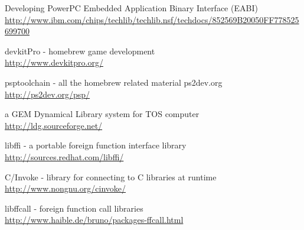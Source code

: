 \begin{thebibliography}{14}
        Developing PowerPC Embedded Application Binary Interface (EABI)\\
        \url{http://www.ibm.com/chips/techlib/techlib.nsf/techdocs/852569B20050FF778525699700}

	devkitPro - homebrew game development\\
	\url{http://www.devkitpro.org/}

	psptoolchain - all the homebrew related material ps2dev.org\\
	\url{http://ps2dev.org/psp/}

	a GEM Dynamical Library system for TOS computer\\
	\url{http://ldg.sourceforge.net/}

	libffi - a portable foreign function interface library\\
	\url{http://sources.redhat.com/libffi/}

	C/Invoke - library for connecting to C libraries at runtime\\
	\url{http://www.nongnu.org/cinvoke/}

	libffcall - foreign function call libraries\\
	\url{http://www.haible.de/bruno/packages-ffcall.html}

\end{thebibliography}

